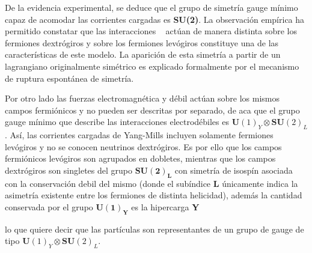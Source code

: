 \begin{itemize}
De la evidencia experimental, se deduce que el grupo de simetría gauge mínimo capaz de acomodar las corrientes cargadas es \textbf{SU(2)}. La observación empírica ha permitido constatar que las interacciones \EW ~ actúan de manera distinta sobre los fermiones dextrógiros y sobre los fermiones levógiros constituye una de las características de este modelo. La aparición de esta simetría a partir de un lagrangiano originalmente simétrico es explicado formalmente por el mecanismo de ruptura espontánea de simetría.

Por otro lado las fuerzas electromagnética y débil actúan sobre los mismos campos fermiónicos y no pueden ser descritas por separado, de aca que el grupo gauge mínimo que describe las interacciones electrodébiles es $\mathbf{U}(1)_Y \otimes \mathbf{SU}(2)_L$. Así, las corrientes cargadas de Yang-Mills incluyen solamente fermiones levógiros y no se conocen neutrinos dextrógiros. Es por ello que los campos fermiónicos levógiros son agrupados en dobletes, mientras que los campos dextrógiros son singletes del grupo $\mathbf{SU(2)_{L}}$ con simetría de isospín asociada con la conservación debil del mismo (donde el subíndice \textbf{L} únicamente indica la asimetría existente entre los fermiones de distinta helicidad), además la cantidad conservada por el grupo $\mathbf{U(1)_{Y}}$ es la hipercarga \textbf{Y}

lo que quiere decir que las partículas son representantes de un grupo de gauge de tipo $\mathbf{U}(1)_Y \otimes \mathbf{SU}(2)_L$.


\end{itemize}
